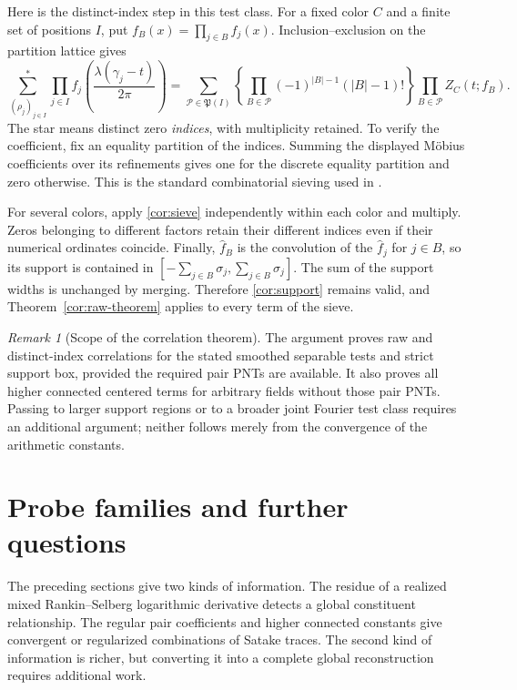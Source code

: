 \documentclass[11pt,reqno]{amsart}
\numberwithin{equation}{section}
\theoremstyle{definition}
\theoremstyle{remark}
\newtheorem{remark}[theorem]{Remark}
\begin{document}
Here is the distinct-index step in this test class. For a fixed color $C$ and a finite set of positions $I$, put $f_B(x)=\prod_{j\in B}f_j(x)$. Inclusion--exclusion on the partition lattice gives
\begin{equation}\sum_{(\rho_j)_{j\in I}}^{*}\prod_{j\in I}
 f_j\left(\frac{\lambda(\gamma_j-t)}{2\pi}\right)
=\sum_{\mathcal P\in\mathfrak P(I)}
\left\{\prod_{B\in\mathcal P}(-1)^{|B|-1}(|B|-1)!\right\}
\prod_{B\in\mathcal P}Z_C(t;f_B).
\label{cor:sieve}\end{equation}
The star means distinct zero \emph{indices}, with multiplicity retained. To verify the coefficient, fix an equality partition of the indices. Summing the displayed M\"obius coefficients over its refinements gives one for the discrete equality partition and zero otherwise. This is the standard combinatorial sieving used in \cite{RS,LiuYe2002}.

For several colors, apply \eqref{cor:sieve} independently within each color and multiply. Zeros belonging to different factors retain their different indices even if their numerical ordinates coincide. Finally, $\widehat f_B$ is the convolution of the $\widehat f_j$ for $j\in B$, so its support is contained in $[-\sum_{j\in B}\sigma_j,\sum_{j\in B}\sigma_j]$. The sum of the support widths is unchanged by merging. Therefore \eqref{cor:support} remains valid, and Theorem~\ref{cor:raw-theorem} applies to every term of the sieve.

\begin{remark}[Scope of the correlation theorem]
The argument proves raw and distinct-index correlations for the stated smoothed separable tests and strict support box, provided the required pair PNTs are available. It also proves all higher connected centered terms for arbitrary fields without those pair PNTs. Passing to larger support regions or to a broader joint Fourier test class requires an additional argument; neither follows merely from the convergence of the arithmetic constants.
\end{remark}


\section{Probe families and further questions}\label{pr:section}
The preceding sections give two kinds of information. The residue of a realized mixed Rankin--Selberg logarithmic derivative detects a global constituent relationship. The regular pair coefficients and higher connected constants give convergent or regularized combinations of Satake traces. The second kind of information is richer, but converting it into a complete global reconstruction requires additional work.
\end{document}
